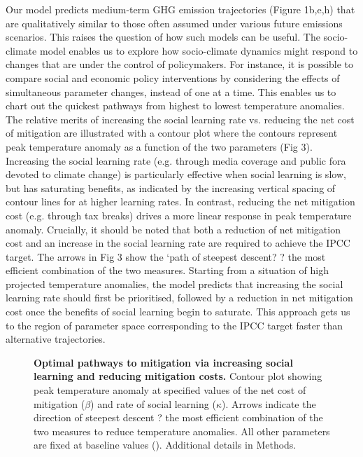 \documentclass[10pt,letterpaper]{article}
\begin{document}
Our model predicts medium-term GHG emission trajectories (Figure 1b,e,h) that are qualitatively similar to those often assumed under various future emissions scenarios. This raises the question of how such models can be useful. The socio-climate model enables us to explore how socio-climate dynamics might respond to changes that are under the control of policymakers. For instance, it is possible to compare social and economic policy interventions by considering the effects of simultaneous parameter changes, instead of one at a time. This enables us to chart out the quickest pathways from highest to lowest temperature anomalies. The relative merits of increasing the social learning rate vs. reducing the net cost of mitigation are illustrated with a contour plot where the contours represent peak temperature anomaly as a function of the two parameters (Fig 3). Increasing the social learning rate (e.g. through media coverage and public fora devoted to climate change) is particularly effective when social learning is slow, but has saturating benefits, as indicated by the increasing vertical spacing of contour lines for at higher learning rates. In contrast, reducing the net mitigation cost (e.g. through tax breaks) drives a more linear response in peak temperature anomaly. Crucially, it should be noted that both a reduction of net mitigation cost and an increase in the social learning rate are required to achieve the IPCC target. The arrows in Fig 3 show the `path of steepest descent? ? the most efficient combination of the two measures. Starting from a situation of high projected temperature anomalies, the model predicts that increasing the social learning rate should first be prioritised, followed by a reduction in net mitigation cost once the benefits of social learning begin to saturate. This approach gets us to the region of parameter space corresponding to the IPCC target faster than alternative trajectories.


\begin{figure}[!ht]
\caption{{\bf Optimal pathways to mitigation via increasing social learning and reducing mitigation costs.}
Contour plot showing peak temperature anomaly at specified values of the net cost of mitigation ($\beta$) and rate of social learning ($\kappa$). Arrows indicate the direction of steepest descent ? the most efficient combination of the two measures to reduce temperature anomalies. All other parameters are fixed at baseline values (). Additional details in Methods.}
\label{fig3}
\end{figure}
\end{document}
